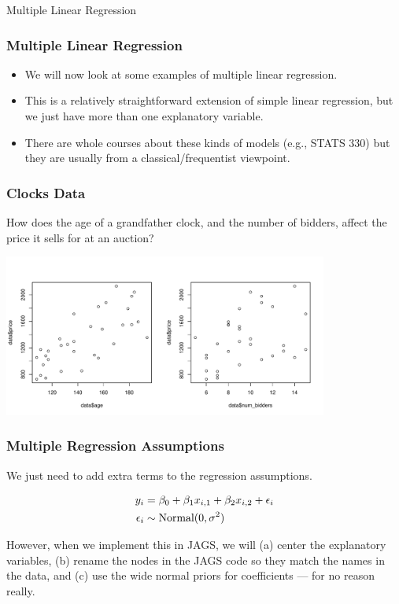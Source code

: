 \documentclass{beamer}
\begin{document}
\begin{frame}

\Large
\begin{center}
Multiple Linear Regression
\end{center}

\end{frame}



\begin{frame}
\frametitle{Multiple Linear Regression}
\begin{itemize}
\item We will now look at some examples of multiple linear regression.\pause
\item This is a relatively straightforward extension of simple linear
regression, but we just have more than one explanatory variable.\pause
\item There are whole courses about these kinds of models (e.g., STATS 330)
but they are usually from a classical/frequentist viewpoint.
\end{itemize}
\end{frame}



\begin{frame}
\frametitle{Clocks Data}
How does the age of a grandfather clock, and the number of bidders,
affect the price it sells for at an auction?

\begin{center}
\includegraphics[width=0.8\textwidth]{images/clocks.pdf}
\end{center}

\end{frame}


\begin{frame}
\frametitle{Multiple Regression Assumptions}
We just need to add extra terms to the regression assumptions.

\begin{align}
y_i &= \beta_0 + \beta_1 x_{i, 1} + \beta_2 x_{i, 2} + \epsilon_i \\
\epsilon_i &\sim \textnormal{Normal}(0, \sigma^2)
\end{align}

\pause

However, when we implement this in JAGS, we will (a) center the
explanatory variables, (b) rename the nodes in the JAGS code
so they match the names in the data, and (c) use the wide
normal priors for coefficients --- for no reason really.

\end{frame}
\end{document}

